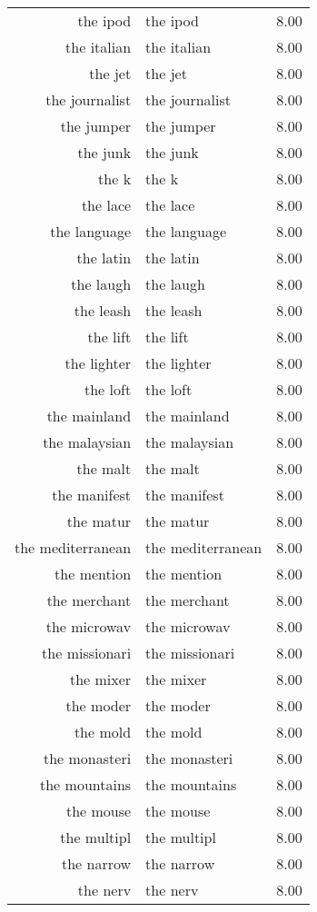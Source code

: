 \begin{table}[ht]
\begin{tabular}{rlr}
  the ipod & the ipod & 8.00 \\ 
  the italian & the italian & 8.00 \\ 
  the jet & the jet & 8.00 \\ 
  the journalist & the journalist & 8.00 \\ 
  the jumper & the jumper & 8.00 \\ 
  the junk & the junk & 8.00 \\ 
  the k & the k & 8.00 \\ 
  the lace & the lace & 8.00 \\ 
  the language & the language & 8.00 \\ 
  the latin & the latin & 8.00 \\ 
  the laugh & the laugh & 8.00 \\ 
  the leash & the leash & 8.00 \\ 
  the lift & the lift & 8.00 \\ 
  the lighter & the lighter & 8.00 \\ 
  the loft & the loft & 8.00 \\ 
  the mainland & the mainland & 8.00 \\ 
  the malaysian & the malaysian & 8.00 \\ 
  the malt & the malt & 8.00 \\ 
  the manifest & the manifest & 8.00 \\ 
  the matur & the matur & 8.00 \\ 
  the mediterranean & the mediterranean & 8.00 \\ 
  the mention & the mention & 8.00 \\ 
  the merchant & the merchant & 8.00 \\ 
  the microwav & the microwav & 8.00 \\ 
  the missionari & the missionari & 8.00 \\ 
  the mixer & the mixer & 8.00 \\ 
  the moder & the moder & 8.00 \\ 
  the mold & the mold & 8.00 \\ 
  the monasteri & the monasteri & 8.00 \\ 
  the mountains & the mountains & 8.00 \\ 
  the mouse & the mouse & 8.00 \\ 
  the multipl & the multipl & 8.00 \\ 
  the narrow & the narrow & 8.00 \\ 
  the nerv & the nerv & 8.00 \\ 

\end{tabular}
\end{table}
